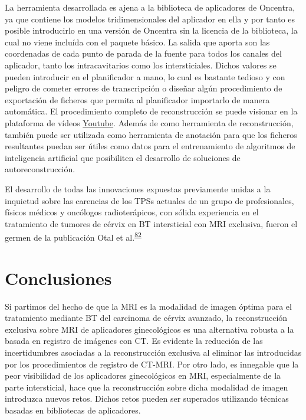 \documentclass[
  a4paper,
]{scrreprt}
\begin{document}
La herramienta desarrollada es ajena a la biblioteca de aplicadores de
Oncentra, ya que contiene los modelos tridimensionales del aplicador en
ella y por tanto es posible introducirlo en una versión de Oncentra sin
la licencia de la biblioteca, la cual no viene incluída con el paquete
básico. La salida que aporta son las coordenadas de cada punto de parada
de la fuente para todos los canales del aplicador, tanto los
intracavitarios como los intersticiales. Dichos valores se pueden
introducir en el planificador a mano, lo cual es bastante tedioso y con
peligro de cometer errores de transcripción o diseñar algún
procedimiento de exportación de ficheros que permita al planificador
importarlo de manera automática. El procedimiento completo de
reconstrucción se puede visionar en la plataforma de vídeos
\href{https://youtu.be/kv827vIsAZM}{Youtube}. Además de como herramienta
de reconstrucción, también puede ser utilizada como herramienta de
anotación para que los ficheros resultantes puedan ser útiles como datos
para el entrenamiento de algoritmos de inteligencia artificial que
posibiliten el desarrollo de soluciones de autoreconstrucción.

El desarrollo de todas las innovaciones expuestas previamente unidas a
la inquietud sobre las carencias de los TPSs actuales de un grupo de
profesionales, físicos médicos y oncólogos radioterápicos, con sólida
experiencia en el tratamiento de tumores de cérvix en BT intersticial
con MRI exclusiva, fueron el germen de la publicación Otal et
al.\textsuperscript{\protect\hyperlink{ref-otal2022}{82}}


\hypertarget{conclusiones}{%
\chapter{Conclusiones}\label{conclusiones}}

Si partimos del hecho de que la MRI es la modalidad de imagen óptima
para el tratamiento mediante BT del carcinoma de cérvix avanzado, la
reconstrucción exclusiva sobre MRI de aplicadores ginecológicos es una
alternativa robusta a la basada en registro de imágenes con CT. Es
evidente la reducción de las incertidumbres asociadas a la
reconstrucción exclusiva al eliminar las introducidas por los
procedimientos de registro de CT-MRI. Por otro lado, es innegable que la
peor visibilidad de los aplicadores ginecológicos en MRI, especialmente
de la parte intersticial, hace que la reconstrucción sobre dicha
modalidad de imagen introduzca nuevos retos. Dichos retos pueden ser
superados utilizando técnicas basadas en bibliotecas de aplicadores.
\end{document}
